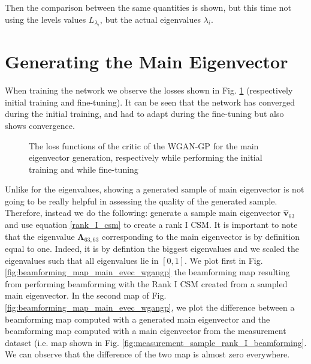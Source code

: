 \documentclass[11pt,a4paper,twoside]{report}
\begin{document}
Then the comparison between the same quantities is shown, but this time not using the levels values $L_{\lambda_i}$, but the actual eigenvalues $\lambda_{i}$.

\section{Generating the Main Eigenvector}

When training the network we observe the losses shown in Fig. \ref{fig:loss_main_evec_wgangp} (respectively initial training and fine-tuning). It can be seen that the network has converged during the initial training, and had to adapt during the fine-tuning but also shows convergence.

\begin{figure}
    \centering
    \caption{The loss functions of the critic of the WGAN-GP for the main eigenvector generation, respectively while performing the initial training and while fine-tuning}
    \label{fig:loss_main_evec_wgangp}
\end{figure}

Unlike for the eigenvalues, showing a generated sample of main eigenvector is not going to be really helpful in assessing the quality of the generated sample. Therefore, instead we do the following: generate a sample main eigenvector $\hat{\mathbf{v}}_{63}$ and use equation \ref{rank_I_csm} to create a rank I CSM. It is important to note that the eigenvalue $\mathbf{\Lambda}_{63, 63}$ corresponding to the main eigenvector is by definition equal to one. Indeed, it is by defintion the biggest eigenvalues and we scaled the eigenvalues such that all eigenvalues lie in $[0,1]$. We plot first in Fig. \ref{fig:beamforming_map_main_evec_wgangp} the beamforming map resulting from performing beamforming with the Rank I CSM created from a sampled main eigenvector. In the second map of Fig. \ref{fig:beamforming_map_main_evec_wgangp}, we plot the difference between a beamforming map computed with a generated main eigenvector and the beamforming map computed with a main eigenvector from the measurement dataset (i.e. map shown in Fig. \ref{fig:measurement_sample_rank_I_beamforming}. We can observe that the difference of the two map is almost zero everywhere.
\end{document}
